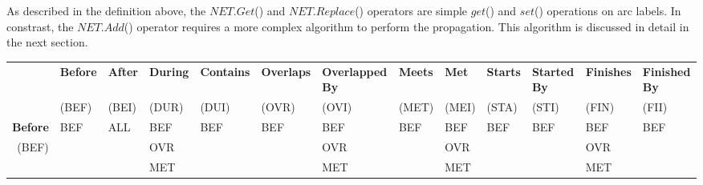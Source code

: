 \documentclass[11pt]{report}
\newenvironment{vvarmargin}[2]
{
  \begin{list}{}
  {
    \setlength{\topsep}{0pt}
    \setlength{\leftmargin}{0pt}
    \setlength{\rightmargin}{0pt}
    \setlength{\listparindent}{\parindent}
    \setlength{\itemindent}{\parindent}
    \setlength{\parsep}{0pt plus 1pt}
    \addtolength{\leftmargin}{#1}\addtolength{\rightmargin}{#2}
  }
  \item
}
{
  \end{list}
}
\begin{document}
          As described in the definition above, the $NET.Get$() and
          $NET.Replace$() operators are simple $get$() and $set$() operations
          on arc labels. In constrast, the $NET.Add$() operator requires a
          more complex algorithm to perform the propagation. This algorithm is
          discussed in detail in the next section.

          \begin{table}[p]
            \begin{vvarmargin}{-4cm}{-4cm}
              \begin{center}
                \tiny
                \begin{tabular}[t]{|r|l|l|l|l|l|l|l|l|l|l|l|l|}
                  \hline
                                          & \textbf{Before}         & \textbf{After}          & \textbf{During}         & \textbf{Contains}       & \textbf{Overlaps}       & \textbf{Overlapped By}  & \textbf{Meets}          & \textbf{Met}            & \textbf{Starts}         & \textbf{Started By}     & \textbf{Finishes}       & \textbf{Finished By}    \\
                                          & (BEF)                   & (BEI)                   & (DUR)                   & (DUI)                   & (OVR)                   & (OVI)                   & (MET)                   & (MEI)                   & (STA)                   & (STI)                   & (FIN)                   & (FII)                   \\
                  \hline
                  \textbf{Before}         & BEF                     & ALL                     & BEF                     & BEF                     & BEF                     & BEF                     & BEF                     & BEF                     & BEF                     & BEF                     & BEF                     & BEF                     \\
                  (BEF)                   &                         &                         & OVR                     &                         &                         & OVR                     &                         & OVR                     &                         &                         & OVR                     &                         \\
                                          &                         &                         & MET                     &                         &                         & MET                     &                         & MET                     &                         &                         & MET                     &                         \\

\end{tabular}
\end{center}
\end{vvarmargin}
\end{table}
\end{document}
